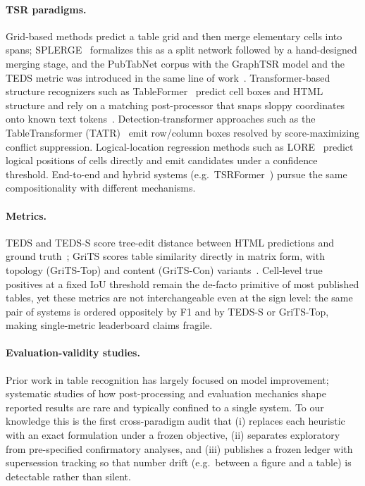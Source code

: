 \documentclass[final,5p,times,twocolumn]{elsarticle}
\newcommand{\eg}{e.g.}
\begin{document}
\paragraph{TSR paradigms.} Grid-based methods predict a table grid and then
merge elementary cells into spans; SPLERGE~\cite{tensmeyer2019} formalizes
this as a split network followed by a hand-designed merging stage, and the
PubTabNet corpus with the GraphTSR model and the TEDS metric was introduced in
the same line of work~\cite{zhong2020}. Transformer-based structure
recognizers such as TableFormer~\cite{nassar2022tableformer} predict cell
boxes and HTML structure and rely on a matching post-processor that snaps
sloppy coordinates onto known text
tokens~\cite{nassar2022tableformer,auer2024docling}. Detection-transformer
approaches such as the TableTransformer (TATR)~\cite{smock2022pubtables1m}
emit row/column boxes resolved by score-maximizing conflict suppression.
Logical-location regression methods such as
LORE~\cite{xing2023lore} predict logical positions of cells directly and emit
candidates under a confidence threshold. End-to-end and hybrid systems
(\eg\ TSRFormer~\cite{song2022tsrformer}) pursue the same compositionality
with different mechanisms.

\paragraph{Metrics.} TEDS and TEDS-S score tree-edit distance between HTML
predictions and ground truth~\cite{zhong2020}; GriTS scores table similarity
directly in matrix form, with topology (GriTS-Top) and content (GriTS-Con)
variants~\cite{smock2023grits}. Cell-level true positives at a fixed IoU
threshold remain the de-facto primitive of most published tables, yet these
metrics are not interchangeable even at the sign level: the
same pair of systems is ordered oppositely by F1 and by TEDS-S or GriTS-Top,
making single-metric leaderboard claims fragile.

\paragraph{Evaluation-validity studies.} Prior work in table recognition has
largely focused on model improvement; systematic studies of how
post-processing and evaluation mechanics shape reported results are rare and
typically confined to a single system. To our knowledge this is the first
cross-paradigm audit that (i) replaces each heuristic with an exact
formulation under a frozen objective, (ii) separates exploratory from
pre-specified confirmatory analyses, and (iii) publishes a frozen ledger with
supersession tracking so that number drift (\eg\ between a figure and a
table) is detectable rather than silent.
\end{document}
